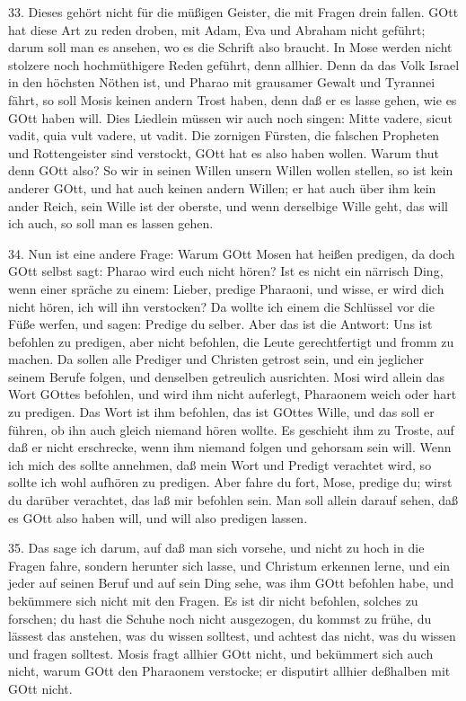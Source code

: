 33. Dieses gehört nicht für die müßigen Geister, die mit Fragen drein fallen. GOtt hat diese Art zu reden droben, mit Adam, Eva und Abraham nicht geführt; darum soll man es ansehen, wo es die Schrift also braucht. In Mose werden nicht stolzere noch hochmüthigere Reden geführt, denn allhier. Denn da das Volk Israel in den höchsten Nöthen ist, und Pharao mit
grausamer Gewalt und Tyrannei fährt, so soll Mosis keinen andern Trost haben, denn daß er es lasse gehen, wie es GOtt haben will. Dies Liedlein müssen wir auch noch singen: Mitte vadere, sicut vadit, quia vult vadere, ut vadit. Die zornigen Fürsten, die falschen Propheten und Rottengeister sind verstockt, GOtt hat es also haben wollen. Warum thut denn GOtt also? So wir in seinen Willen unsern Willen wollen stellen, so ist kein anderer GOtt, und hat auch keinen andern Willen; er hat auch über ihm kein ander Reich, sein Wille ist der oberste, und wenn derselbige Wille geht, das will ich auch, so soll man es lassen gehen.

34. Nun ist eine andere Frage: Warum GOtt Mosen hat heißen predigen, da doch GOtt selbst sagt: Pharao wird euch nicht hören? Ist es nicht ein närrisch Ding, wenn einer spräche zu einem: Lieber, predige Pharaoni, und wisse, er wird dich nicht hören, ich will ihn verstocken? Da wollte ich einem die Schlüssel vor die Füße werfen, und sagen: Predige du selber. Aber das ist die Antwort: Uns ist befohlen zu predigen, aber nicht befohlen, die Leute gerechtfertigt und fromm zu machen. Da sollen alle Prediger und Christen getrost sein, und ein jeglicher seinem Berufe folgen, und denselben getreulich ausrichten. Mosi wird allein das Wort GOttes befohlen, und wird ihm nicht auferlegt, Pharaonem weich oder hart zu predigen. Das Wort ist ihm befohlen, das ist GOttes Wille, und das soll er führen, ob ihn auch gleich niemand hören wollte. Es geschieht ihm zu Troste, auf daß er nicht erschrecke, wenn ihm niemand folgen und gehorsam sein will. Wenn ich mich des sollte annehmen, daß mein Wort und Predigt verachtet wird, so sollte ich wohl aufhören zu predigen. Aber fahre du fort, Mose, predige du; wirst du darüber verachtet, das laß mir befohlen sein. Man soll allein darauf sehen, daß es GOtt also haben will, und will also predigen lassen.

35. Das sage ich darum, auf daß man sich vorsehe, und nicht zu hoch in die Fragen fahre, sondern herunter sich lasse, und Christum erkennen lerne, und ein jeder auf seinen Beruf und auf sein Ding sehe, was ihm GOtt befohlen habe, und bekümmere sich nicht mit den Fragen. Es ist dir nicht befohlen, solches zu forschen; du hast die Schuhe noch nicht ausgezogen, du kommst zu frühe, du lässest das anstehen, was du wissen solltest, und achtest das nicht, was du wissen und fragen solltest. Mosis fragt allhier GOtt nicht, und bekümmert sich auch nicht, warum GOtt den Pharaonem verstocke; er disputirt allhier deßhalben mit GOtt nicht.

